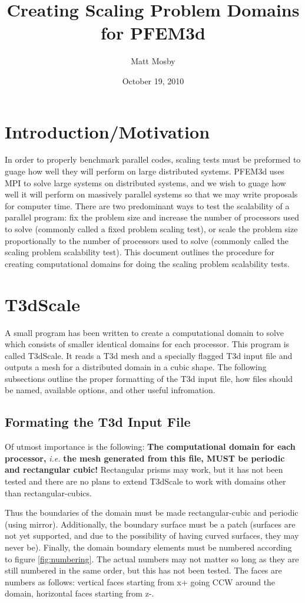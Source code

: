 \documentclass{article}
\date{October 19, 2010}
\author{Matt Mosby}
\title{Creating Scaling Problem Domains for PFEM3d}
\begin{document}
\maketitle

\section{Introduction/Motivation}
In order to properly benchmark parallel codes, scaling tests must be
preformed to guage how well they will perform on large distributed
systems. PFEM3d uses MPI to solve large systems on distributed
systems, and we wish to guage how well it will perform on massively
parallel systems so that we may write proposals for computer time.
There are two predominant ways to test the scalability of a parallel
program: fix the problem size and increase the number of processors
used to solve (commonly called a fixed problem scaling test), or scale
the problem size proportionally to the number of processors used to solve
(commonly called the scaling problem scalability test). This document
outlines the procedure for creating computational domains for doing
the scaling problem scalability tests.

\section{T3dScale}
A small program has been written to create a computational domain to
solve which consists of smaller identical domains for each processor.
This program is called T3dScale. It reads a T3d mesh and a specially
flagged T3d input file and outputs a mesh for a distributed domain in
a cubic shape.  The following subsections outline the proper
formatting of the T3d input file, how files should be named, available
options, and other useful infromation.

\subsection{Formating the T3d Input File}
Of utmost importance is the following: {\bf The computational domain
  for each processor,} {\it i.e.} {\bf the mesh generated from this file,
  MUST be periodic and rectangular cubic!} Rectangular prisms may
work, but it has not been tested and there are no plans to extend
T3dScale to work with domains other than rectangular-cubics.

Thus the boundaries of the domain must be made rectangular-cubic and
periodic (using mirror).  Additionally, the boundary surface must be a
patch (surfaces are not yet supported, and due to the possibility of
having curved surfaces, they may never be).  Finally, the domain
boundary elements must be numbered according to figure \ref{fig:numbering}.  The actual
numbers may not matter so long as they are still numbered in the same
order, but this has not been tested.  The faces are numbers as
follows: vertical faces starting from x+ going CCW around the domain,
horizontal faces starting from z-.
\end{document}
